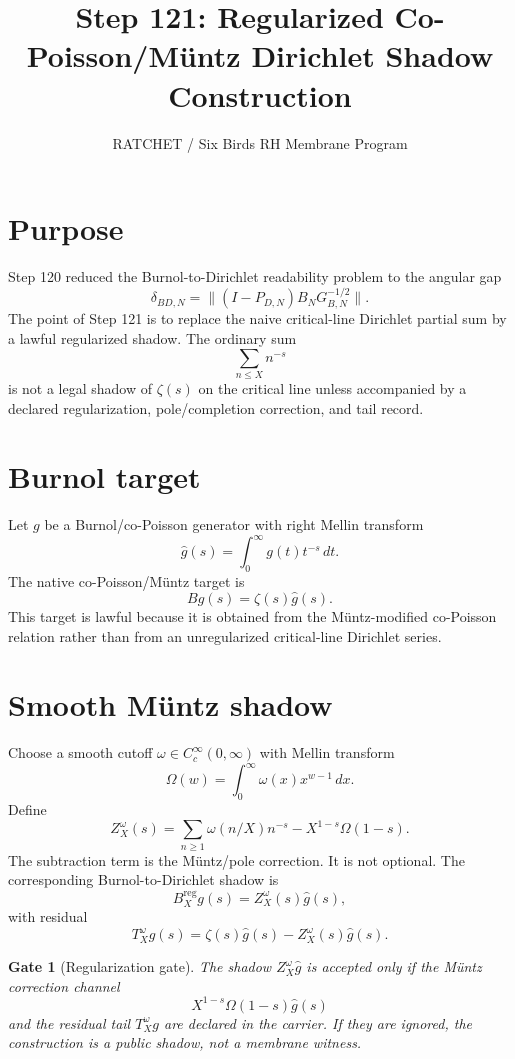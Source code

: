 \documentclass[11pt]{article}
\title{Step 121: Regularized Co-Poisson/M\"untz Dirichlet Shadow Construction}
\author{RATCHET / Six Birds RH Membrane Program}
\date{}
\newtheorem{gate}{Gate}
\begin{document}
\maketitle

\section{Purpose}
Step 120 reduced the Burnol-to-Dirichlet readability problem to the angular gap
\[
\delta_{BD,N}=\|(I-P_{D,N})B_NG_{B,N}^{-1/2}\|.
\]
The point of Step 121 is to replace the naive critical-line Dirichlet partial sum by a lawful regularized shadow. The ordinary sum
\[
\sum_{n\le X}n^{-s}
\]
is not a legal shadow of \(\zeta(s)\) on the critical line unless accompanied by a declared regularization, pole/completion correction, and tail record.

\section{Burnol target}
Let \(g\) be a Burnol/co-Poisson generator with right Mellin transform
\[
\widehat g(s)=\int_0^\infty g(t)t^{-s}\,dt.
\]
The native co-Poisson/M\"untz target is
\[
B g(s)=\zeta(s)\widehat g(s).
\]
This target is lawful because it is obtained from the M\"untz-modified co-Poisson relation rather than from an unregularized critical-line Dirichlet series.

\section{Smooth M\"untz shadow}
Choose a smooth cutoff \(\omega\in C_c^\infty(0,\infty)\) with Mellin transform
\[
\Omega(w)=\int_0^\infty \omega(x)x^{w-1}\,dx.
\]
Define
\[
Z_X^\omega(s)
=
\sum_{n\ge1}\omega(n/X)n^{-s}-X^{1-s}\Omega(1-s).
\]
The subtraction term is the M\"untz/pole correction. It is not optional. The corresponding Burnol-to-Dirichlet shadow is
\[
B_X^{\mathrm{reg}}g(s)=Z_X^\omega(s)\widehat g(s),
\]
with residual
\[
T_X^\omega g(s)=\zeta(s)\widehat g(s)-Z_X^\omega(s)\widehat g(s).
\]

\begin{gate}[Regularization gate]
The shadow \(Z_X^\omega\widehat g\) is accepted only if the M\"untz correction channel
\[
X^{1-s}\Omega(1-s)\widehat g(s)
\]
and the residual tail \(T_X^\omega g\) are declared in the carrier. If they are ignored, the construction is a public shadow, not a membrane witness.
\end{gate}
\end{document}
